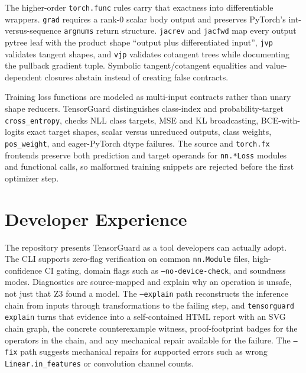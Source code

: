 \documentclass[11pt]{article}
\newcommand{\tg}{TensorGuard}
\begin{document}
The higher-order \texttt{torch.func} rules carry that exactness into
differentiable wrappers.  \texttt{grad} requires a rank-0 scalar body output and
preserves PyTorch's int-versus-sequence \texttt{argnums} return structure.
\texttt{jacrev} and \texttt{jacfwd} map every output pytree leaf with the product
shape ``output plus differentiated input'', \texttt{jvp} validates tangent
shapes, and \texttt{vjp} validates cotangent trees while documenting the pullback
gradient tuple.  Symbolic tangent/cotangent equalities and value-dependent
closures abstain instead of creating false contracts.

Training loss functions are modeled as multi-input contracts rather than unary
shape reducers.  \tg{} distinguishes class-index and probability-target
\texttt{cross\_entropy}, checks NLL class targets, MSE and KL broadcasting,
BCE-with-logits exact target shapes, scalar versus unreduced outputs, class
weights, \texttt{pos\_weight}, and eager-PyTorch dtype failures.  The source and
\texttt{torch.fx} frontends preserve both prediction and target operands for
\texttt{nn.*Loss} modules and functional calls, so malformed training snippets
are rejected before the first optimizer step.

\clearpage

\section{Developer Experience}

The repository presents \tg{} as a tool developers can actually adopt.  The CLI
supports zero-flag verification on common \texttt{nn.Module} files, high-
confidence CI gating, domain flags such as \texttt{--no-device-check}, and
soundness modes.  Diagnostics are source-mapped and explain why an operation is
unsafe, not just that Z3 found a model.  The \texttt{--explain} path reconstructs
the inference chain from inputs through transformations to the failing step, and
\texttt{tensorguard explain} turns that evidence into a self-contained HTML
report with an SVG chain graph, the concrete counterexample witness,
proof-footprint badges for the operators in the chain, and any mechanical repair
available for the failure.
The \texttt{--fix} path suggests mechanical repairs for supported errors such
as wrong \texttt{Linear.in\_features} or convolution channel counts.
\end{document}
